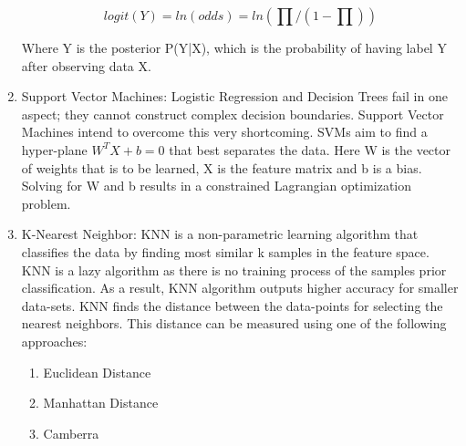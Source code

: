 \documentclass[journal]{IEEEtran}
\begin{document}
\begin{enumerate}
	$$logit(Y) = ln(odds) = ln(\prod/(1-\prod))$$

	Where Y is the posterior P(Y|X), which is the probability of having label Y after observing data X. 

    \item Support Vector Machines: Logistic Regression and Decision Trees fail in one aspect; they cannot construct complex decision boundaries. Support Vector Machines intend to overcome this very shortcoming. SVMs aim to find a hyper-plane $W^TX+b=0$ that best separates  the data. Here W is the vector of weights that is to be learned, X is the feature matrix and b is a bias. Solving for W and b results in a constrained Lagrangian optimization problem.


    \item K-Nearest Neighbor: KNN is a non-parametric learning algorithm that classifies the data by finding most similar k samples in the feature space. KNN is a lazy algorithm as there is no training process of the samples prior classification. As a result, KNN algorithm outputs higher accuracy for smaller data-sets. KNN finds the distance between the data-points for selecting the nearest neighbors. This distance can be measured using one of the following approaches: 
    \begin{enumerate}
        \item Euclidean Distance
        \item Manhattan Distance
        \item Camberra
    \end{enumerate}
\end{enumerate}
\end{document}
